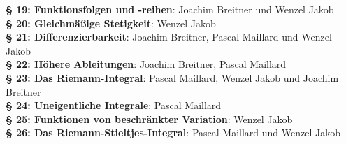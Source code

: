 \documentclass[a4paper,oneside,DIV15,BCOR12mm]{scrbook}
\begin{document}
\textbf{§ 19: Funktionsfolgen und -reihen}: Joachim Breitner und Wenzel Jakob\\
\textbf{§ 20: Gleichmäßige Stetigkeit}: Wenzel Jakob\\
\textbf{§ 21: Differenzierbarkeit}: Joachim Breitner, Pascal Maillard und Wenzel Jakob\\
\textbf{§ 22: Höhere Ableitungen}: Joachim Breitner, Pascal Maillard\\
\textbf{§ 23: Das Riemann-Integral}: Pascal Maillard, Wenzel Jakob und Joachim Breitner\\
\textbf{§ 24: Uneigentliche Integrale}: Pascal Maillard\\
\textbf{§ 25: Funktionen von beschränkter Variation}: Wenzel Jakob\\
\textbf{§ 26: Das Riemann-Stieltjes-Integral}: Pascal Maillard und Wenzel Jakob\\
\end{document}
